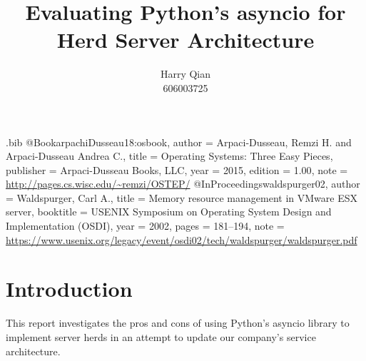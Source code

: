 \usepackage{filecontents}

\begin{filecontents}{\jobname.bib}
@Book{arpachiDusseau18:osbook,
  author =       {Arpaci-Dusseau, Remzi H. and Arpaci-Dusseau Andrea C.},
  title =        {Operating Systems: Three Easy Pieces},
  publisher =    {Arpaci-Dusseau Books, LLC},
  year =         2015,
  edition =      {1.00},
  note =         {\url{http://pages.cs.wisc.edu/~remzi/OSTEP/}}
}
@InProceedings{waldspurger02,
  author =       {Waldspurger, Carl A.},
  title =        {Memory resource management in {VMware ESX} server},
  booktitle =    {USENIX Symposium on Operating System Design and
                  Implementation (OSDI)},
  year =         2002,
  pages =        {181--194},
  note =         {\url{https://www.usenix.org/legacy/event/osdi02/tech/waldspurger/waldspurger.pdf}}}
\end{filecontents}



\date{}

\title{\Large \bf Evaluating Python's asyncio for Herd Server Architecture}

\author{
{\rm Harry Qian}\\
606003725
} %

\maketitle

\section{Introduction}
This report investigates the pros and cons of using Python's asyncio
library to implement server herds in an attempt to update our company's 
service architecture. 


